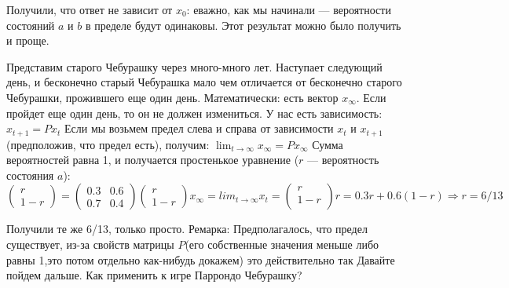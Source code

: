 Получили, что ответ не зависит от $x_0$: еважно, как мы начинали --- вероятности состояний $a$ и $b$ в пределе будут одинаковы. Этот результат можно было получить и проще.

Представим старого Чебурашку через много-много лет. Наступает следующий день, и бесконечно старый Чебурашка мало чем отличается от бесконечно старого Чебурашки, прожившего еще один день.
Математически: есть вектор $x_{\infty}$. Если пройдет еще один день, то он не должен измениться. 
У нас есть зависимость:
$x_{t+1}=Px_t$
Если мы возьмем предел слева и справа от зависимости $x_t$ и $x_{t+1}$(предположив, что предел есть), получим: $\lim_{t\to\infty}x_\infty=Px_{\infty}$ 
Сумма вероятностей равна 1, и получается простенькое уравнение ($r$ --- вероятность состояния $a$):
$\left( \begin{array}{l}
		r\\
		1-r
		\end{array} \right)=
 \left( \begin{array}{ll}
		0.3  & 0.6\\
		0.7  & 0.4
		\end{array} \right)
\left( \begin{array}{l}
		r\\
		1-r
		\end{array} \right) 
x_\infty=lim_{t\to\infty}x_t=
\left( \begin{array}{l}
		r\\
		1-r\\
		\end{array} \right) 
r=0.3r+0.6(1-r) \Rightarrow r=6/13 $
		
Получили те же 6/13, только просто.
Ремарка: Предполагалось, что предел существует, из-за свойств матрицы $P$(его собственные значения меньше либо равны 1,это потом отдельно как-нибудь докажем) это действительно так
Давайте пойдем дальше. Как применить к игре Паррондо Чебурашку?


